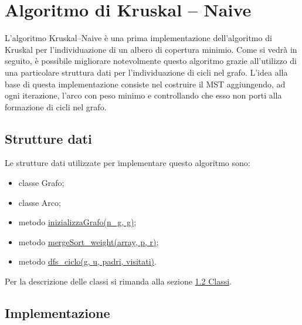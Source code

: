 \section{Algoritmo di Kruskal -- Naive}
\label{Algoritmo_di_Kruskal-naive}

L'algoritmo Kruskal--Naive è una prima implementazione dell'algoritmo di Kruskal per l'individuazione di un albero di copertura minimio. Come si vedrà in seguito, è possibile migliorare notevolmente questo algoritmo grazie all'utilizzo di una particolare struttura dati per l'individuazione di cicli nel grafo. L'idea alla base di questa implementazione consiste nel costruire il MST aggiungendo, ad ogni iterazione, l'arco con peso minimo e controllando che esso non porti alla formazione di cicli nel grafo. 

\subsection{Strutture dati}
\label{strutture_dati}

Le strutture dati utilizzate per implementare questo algoritmo sono:

\begin{itemize}
    \item classe Grafo;
    \item classe Arco;
    \item metodo \hyperlink{inizializzagrafo}{inizializzaGrafo(n\_g, g)};
    \item metodo \hyperlink{mergesort}{mergeSort\_weight(array, p, r)};
    \item metodo \hyperlink{dfsciclo}{dfs\_ciclo(g, u, padri, visitati)}.
\end{itemize}

Per la descrizione delle classi si rimanda alla sezione \hyperlink{section.2}{1.2 Classi}.
\newline

\subsection{Implementazione}
\label{implementazione}


